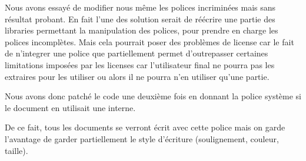 Nous avons essayé de modifier nous même les polices incriminées mais 
sans résultat probant. En fait l'une des solution serait de réécrire une partie des
libraries permettant la manipulation des polices, pour prendre en charge les polices 
incomplètes. Mais cela pourrait poser des problèmes de license car le fait de n'integrer une
police que partiellement permet d'outrepasser certaines limitations imposées par les licenses car 
l'utilisateur final ne pourra pas les extraires pour les utiliser ou alors il ne pourra n'en utiliser qu'une
partie.

 Nous avons donc patché le code une deuxième fois 
en donnant la police système si le document en utilisait une interne.

De ce fait, tous les documents se verront écrit avec cette police mais 
on garde l'avantage de garder partiellement le style d'écriture 
(soulignement, couleur, taille).

